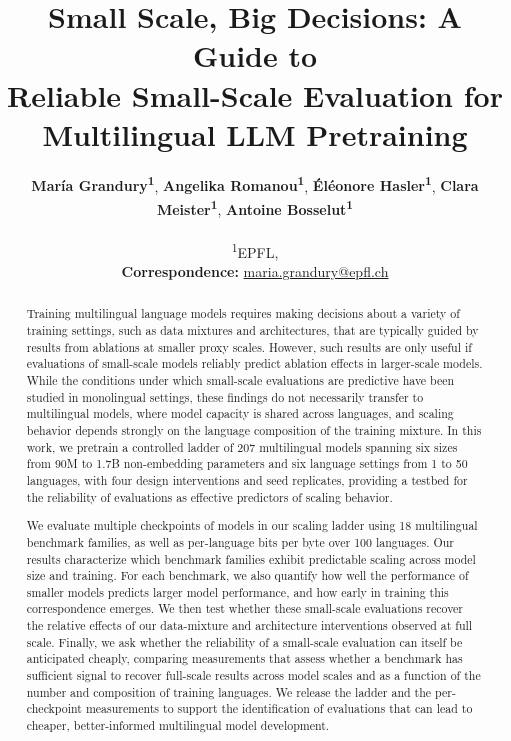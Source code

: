 \documentclass[11pt]{article}
\title{Small Scale, Big Decisions: A Guide to \\ Reliable Small-Scale Evaluation for Multilingual LLM Pretraining}
\author{
  \textbf{María Grandury\textsuperscript{1}},
  \textbf{Angelika Romanou\textsuperscript{1}},
  \textbf{Éléonore Hasler\textsuperscript{1}},
  \textbf{Clara Meister\textsuperscript{1}},
  \textbf{Antoine Bosselut\textsuperscript{1}}
\\
\\
  \textsuperscript{1}EPFL,
\\
  \small{
    \textbf{Correspondence:} \href{mailto:email@domain}{maria.grandury@epfl.ch}
  }
}
\newcommand{\nbenchmarks}{18 }
\newcommand{\nmodels}{207 }
\begin{document}
\maketitle
\begin{abstract}
Training multilingual language models requires making decisions about a variety of training settings, such as data mixtures and architectures, that are typically guided by results from ablations at smaller proxy scales. However, such results are only useful if evaluations of small-scale models reliably predict ablation effects in larger-scale models. 
While the conditions under which small-scale evaluations are predictive have been studied in monolingual settings, these findings do not necessarily transfer to multilingual models, where model capacity is shared across languages, and scaling behavior depends strongly on the language composition of the training mixture. In this work, we pretrain a controlled ladder of \nmodels multilingual models spanning six sizes from 90M to 1.7B non-embedding parameters and six language settings from 1 to 50 languages, with four design interventions and seed replicates, providing a testbed for the reliability of evaluations as effective predictors of scaling behavior. 

We evaluate multiple checkpoints of models in our scaling ladder using \nbenchmarks multilingual benchmark families, as well as per-language bits per byte over 100 languages. Our results characterize which benchmark families exhibit predictable scaling across model size and training. %
For each benchmark, we also quantify how well the performance of smaller models predicts larger model performance, and how early in training this correspondence emerges. We then test whether these small-scale evaluations recover the relative effects of our data-mixture and architecture interventions observed at full scale. Finally, we ask whether the reliability of a small-scale evaluation can itself be anticipated cheaply, comparing measurements that assess whether a benchmark has sufficient signal to recover full-scale results across model scales and as a function of the number and composition of training languages. We release the ladder and the per-checkpoint measurements to support the identification of evaluations that can lead to cheaper, better-informed multilingual model development.


\end{abstract}
\end{document}
